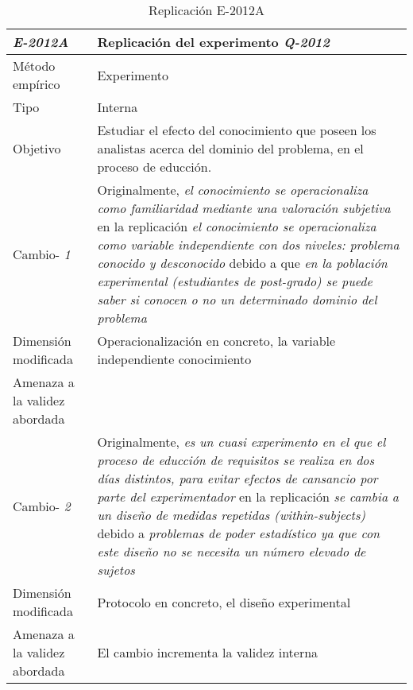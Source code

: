 
\begin{table}
\caption{Replicación E-2012A}
\begin{tabular}{| p{3.3cm} | p{9cm} |}
\hline

\textbf {\textit{E-2012A}} & Replicación del experimento \textit{Q-2012 }    \\  \hline

Método empírico &  Experimento   \\  \hline
Tipo &  Interna   \\  \hline
Objetivo  &  Estudiar el efecto del conocimiento que poseen los analistas acerca del dominio del problema, en el proceso de educción.   \\  \hline \hline

Cambio- \textit{1}   & \parbox[t]{9cm} {Originalmente,  \textit{el conocimiento se operacionaliza como familiaridad mediante una valoración subjetiva} } \parbox[t]{9cm}{en la replicación \textit{ el conocimiento se operacionaliza  como variable independiente con dos niveles: problema conocido y desconocido} }  debido a que \textit{en la población experimental (estudiantes de post-grado) se puede saber si conocen o no un determinado dominio del problema } \\  \hline
Dimensión modificada & 
 Operacionalización en concreto, la variable independiente conocimiento  \\  \hline 
Amenaza a la validez abordada  &   \\  \hline
 \hline
 
Cambio- \textit{2}   & \parbox[t]{9cm} {Originalmente,  \textit{es un cuasi experimento en el que el proceso de educción de requisitos se realiza en dos días distintos, para evitar efectos de cansancio por parte del experimentador} } \parbox[t]{9cm}{en la replicación \textit{ se cambia a un diseño de medidas repetidas (within-subjects)} }  debido a \textit{problemas de poder estadístico ya que con este diseño no se necesita un número elevado de sujetos } \\  \hline
Dimensión modificada & 
 Protocolo en concreto, el diseño experimental  \\  \hline 
Amenaza a la validez abordada  & El cambio incrementa la validez interna  \\  \hline
 \hline
 

\end{tabular}
\end{table}

